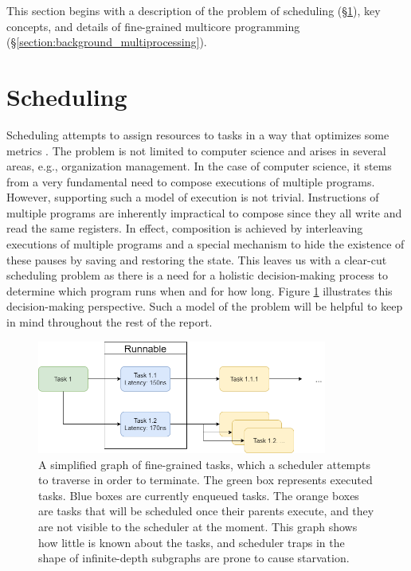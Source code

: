 \documentclass[12pt,a4paper,twoside]{report}
\begin{document}
This section begins with a description of the problem of scheduling (\S\ref{section:background_schedulers}), key concepts, and details of fine-grained multicore programming (\S\ref{section:background_multiprocessing}).

\section{Scheduling}
\label{section:background_schedulers}

Scheduling attempts to assign resources to tasks in a way that optimizes some metrics \cite{Pinedo2012}. The problem is not limited to computer science and arises in several areas, e.g., organization management. In the case of computer science, it stems from a very fundamental need to compose executions of multiple programs. However, supporting such a model of execution is not trivial. Instructions of multiple programs are inherently impractical to compose since they all write and read the same registers. In effect, composition is achieved by interleaving executions of multiple programs and a special mechanism to hide the existence of these pauses by saving and restoring the state. This leaves us with a clear-cut scheduling problem as there is a need for a holistic decision-making process to determine which program runs when and for how long. Figure \ref{fig:sched-graph} illustrates this decision-making perspective. Such a model of the problem will be helpful to keep in mind throughout the rest of the report. 

\begin{figure}
    \centering
    \includegraphics[width=0.85\textwidth]{scheduler_graph.png}
    \caption{A simplified graph of fine-grained tasks, which a scheduler attempts to traverse in order to terminate. The green box represents executed tasks. Blue boxes are currently enqueued tasks. The orange boxes are tasks that will be scheduled once their parents execute, and they are not visible to the scheduler at the moment. This graph shows how little is known about the tasks, and scheduler traps in the shape of infinite-depth subgraphs are prone to cause starvation.}
   \label{fig:sched-graph}
\end{figure}
\end{document}
